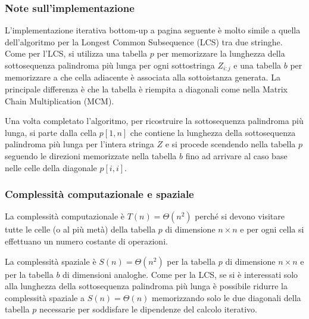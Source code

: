 \subsubsection*{Note sull'implementazione}
L'implementazione iterativa bottom-up a pagina seguente è molto simile a quella dell'algoritmo per la Longest Common
Subsequence (LCS) tra due stringhe. Come per l'LCS, si utilizza una tabella \(p\) per memorizzare la lunghezza della
sottosequenza palindroma più lunga per ogni sottostringa \(Z_{i:j}\) e una tabella \(b\) per memorizzare a che cella
adiacente è associata alla sottoistanza generata. La principale differenza è che la tabella è riempita a diagonali
come nella Matrix Chain Multiplication (MCM).

Una volta completato l'algoritmo, per ricostruire la sottosequenza palindroma più lunga, si parte dalla cella \(p[1, n]\)
che contiene la lunghezza della sottosequenza palindroma più lunga per l'intera stringa \(Z\) e si procede scendendo
nella tabella \(p\) seguendo le direzioni memorizzate nella tabella \(b\) fino ad arrivare al caso base nelle celle
della diagonale \(p[i, i]\).

\subsubsection*{Complessità computazionale e spaziale}
La complessità computazionale è \(T(n) = \Theta(n^2)\) perché si devono visitare tutte le celle (o al più metà) della
tabella \(p\) di dimensione \(n \times n\) e per ogni cella si effettuano un numero costante di operazioni.

La complessità spaziale è \(S(n) = \Theta(n^2)\) per la tabella \(p\) di dimensione \(n \times n\) e per la tabella \(b\)
di dimensioni analoghe. Come per la LCS, se si è interessati solo alla lunghezza della sottosequenza palindroma più lunga
è possibile ridurre la complessità spaziale a \(S(n) = \Theta(n)\) memorizzando solo le due diagonali della tabella \(p\)
necessarie per soddisfare le dipendenze del calcolo iterativo.

\newpage
